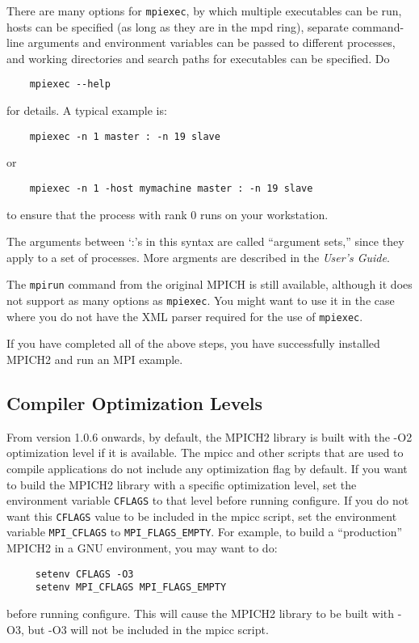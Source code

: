 \documentclass[dvipdfm,11pt]{article}
\begin{document}
\begin{enumerate}
There are many options for \texttt{mpiexec}, by which multiple executables
can be run, hosts can be specified (as long as they are in the mpd
ring), separate command-line arguments and environment variables can
be passed to different processes, and working directories and search
paths for executables can be specified.  Do
\begin{verbatim}
    mpiexec --help
\end{verbatim}
for details. A typical example is:
\begin{verbatim}
    mpiexec -n 1 master : -n 19 slave
\end{verbatim}
or
\begin{verbatim}
    mpiexec -n 1 -host mymachine master : -n 19 slave
\end{verbatim}
to ensure that the process with rank 0 runs on your workstation.

The arguments between `:'s in this syntax are called ``argument sets,''
since they apply to a set of processes.  More argments are described in
the \textit{User's Guide}.

The \texttt{mpirun} command from the original MPICH is still available,
although it does not support as many options as \texttt{mpiexec}.  You might
want to use it in the case where you do not have the XML parser
required for the use of \texttt{mpiexec}.
\end{enumerate}

If you have completed all of the above steps, you have successfully
installed MPICH2 and run an MPI example.  


\subsection{Compiler Optimization Levels}
From version 1.0.6 onwards, by default, the MPICH2 library is built
with the -O2 optimization level if it is available. The mpicc and
other scripts that are used to compile applications do not include any
optimization flag by default. If you want to build the MPICH2 library
with a specific optimization level, set the environment variable
\texttt{CFLAGS} to that level before running configure. If you do not want this
\texttt{CFLAGS} value to be included in the mpicc script, set the environment
variable \texttt{MPI\_CFLAGS} to \texttt{MPI\_FLAGS\_EMPTY}. For example, to build a
``production'' MPICH2 in a GNU environment, you may want to do:
\begin{verbatim}
     setenv CFLAGS -O3
     setenv MPI_CFLAGS MPI_FLAGS_EMPTY
\end{verbatim}
before running configure. This will cause the MPICH2 library to be
built with -O3, but -O3 will not be included in the mpicc script.
\end{document}
